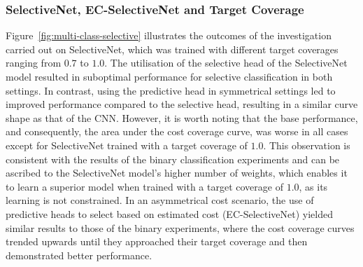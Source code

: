 \subsubsection{SelectiveNet, EC-SelectiveNet and Target Coverage}
Figure~\ref{fig:multi-class-selective} illustrates the outcomes of the investigation carried out on SelectiveNet, which was trained with different target coverages ranging from $0.7$ to $1.0$. The utilisation of the selective head of the SelectiveNet model resulted in suboptimal performance for selective classification in both settings. In contrast, using the predictive head in symmetrical settings led to improved performance compared to the selective head, resulting in a similar curve shape as that of the CNN. However, it is worth noting that the base performance, and consequently, the area under the cost coverage curve, was worse in all cases except for SelectiveNet trained with a target coverage of $1.0$. This observation is consistent with the results of the binary classification experiments and can be ascribed to the SelectiveNet model's higher number of weights, which enables it to learn a superior model when trained with a target coverage of $1.0$, as its learning is not constrained. In an asymmetrical cost scenario, the use of predictive heads to select based on estimated cost (EC-SelectiveNet) yielded similar results to those of the binary experiments, where the cost coverage curves trended upwards until they approached their target coverage and then demonstrated better performance.

